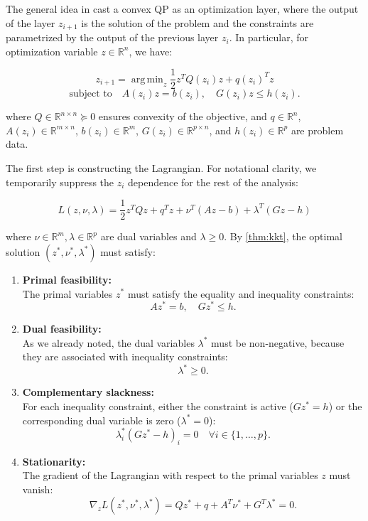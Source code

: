 \documentclass{article}
\DeclareMathOperator*{\argmin}{arg\,min}
\begin{document}
The general idea in \citep{optnet} cast a convex QP as an optimization layer, where the output of the layer $z_{i+1}$ is the solution of the problem and the constraints are parametrized by the output of the previous layer $z_i$. In particular, for optimization variable $z \in \mathbb{R}^n$, we have: 

\[
z_{i+1} = \argmin_{z} \frac{1}{2} z^T Q(z_i) z + q(z_i)^T z
\]
\[
\text{subject to} \quad A(z_i) z = b(z_i), \quad G(z_i) z \leq h(z_i).
\]

where \( Q \in \mathbb{R}^{n \times n} \succeq 0 \) ensures convexity of the objective, and \( q \in \mathbb{R}^n \), 
\( A(z_i) \in \mathbb{R}^{m \times n} \), \( b(z_i) \in \mathbb{R}^m \), \( G(z_i) \in \mathbb{R}^{p \times n} \), and \( h(z_i) \in \mathbb{R}^p \) are problem data. 

The first step is constructing the Lagrangian. For notational clarity, we temporarily suppress the $z_i$ dependence for the rest of the analysis:

\[
L(z,\nu,\lambda) = \frac{1}{2}z^T Q z + q^T z + \nu^T(Az - b) + \lambda^T(Gz - h)
\]

where $\nu \in \mathbb{R}^m, \lambda \in \mathbb{R}^p$ are dual variables and $\lambda \geq 0$. By \ref{thm:kkt}, the optimal solution $(z^*, \nu^*, \lambda^*)$ must satisfy: 

\begin{enumerate}
    \item \textbf{Primal feasibility:} \\
    The primal variables $z^*$ must satisfy the equality and inequality constraints:
    \[
    Az^* = b, \quad Gz^* \leq h.
    \]

    \item \textbf{Dual feasibility:} \\
    As we already noted, the dual variables $\lambda^*$ must be non-negative, because they are associated with inequality constraints:
    \[
    \lambda^* \geq 0.
    \]

    \item \textbf{Complementary slackness:} \\
    For each inequality constraint, either the constraint is active ($Gz^* = h$) or the corresponding dual variable is zero ($\lambda^* = 0$):
    \[
    \lambda_i^* (Gz^* - h)_i = 0 \quad \forall i \in \{1, \ldots, p\}.
    \]

    \item \textbf{Stationarity:} \\
    The gradient of the Lagrangian with respect to the primal variables $z$ must vanish:
    \[
    \nabla_z L(z^*, \nu^*, \lambda^*) = Qz^* + q + A^T\nu^* + G^T\lambda^* = 0.
    \]
\end{enumerate}
\end{document}
